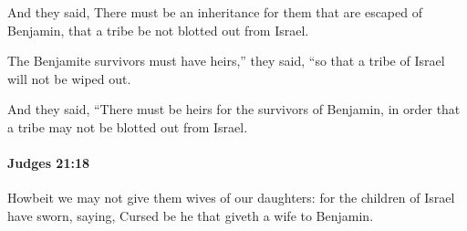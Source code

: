 			\begin{versebox}
					\item[BHS] 
					\item[ASV] And they said, There must be an inheritance for them that are escaped of Benjamin, that a tribe be not blotted out from Israel.
					\item[NIV] The Benjamite survivors must have heirs,” they said, “so that a tribe of Israel will not be wiped out.
					\item[NRSV] And they said, “There must be heirs for the survivors of Benjamin, in order that a tribe may not be blotted out from Israel.
			\end{versebox}

		\paragraph{Judges 21:18} %
			\label{JUDGES-21-18}

			Howbeit we may not give them wives of our daughters: for the children of Israel have sworn, saying, Cursed be he that giveth a wife to Benjamin.

